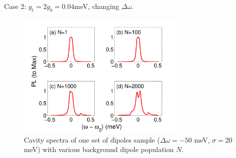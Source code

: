 \documentclass{beamer}
\begin{document}
\begin{frame}{Case 2: $ g_t=2g_b=0.04 $meV, changing $ \Delta\omega $.}

\begin{figure}[thp]%
\centering
\begin{center}
\includegraphics[width=0.72\textwidth]{./Figs/spec1tNb_wd50s20_gt0dot04E0dot5_stat200} %
\end{center}
\caption[Spectra sample for a cavity with a target dipole and an ensemble.]{\fontsize{8}{0.2}\selectfont Cavity spectra of one set of dipoles sample ($\Delta\omega=-50$ meV, $\sigma=20$ meV) with various background dipole population $N$. 
}
\label{spec1tNb_wd50s20_gt0.04E0.5_stat200}
\end{figure}
\end{frame}
\end{document}
